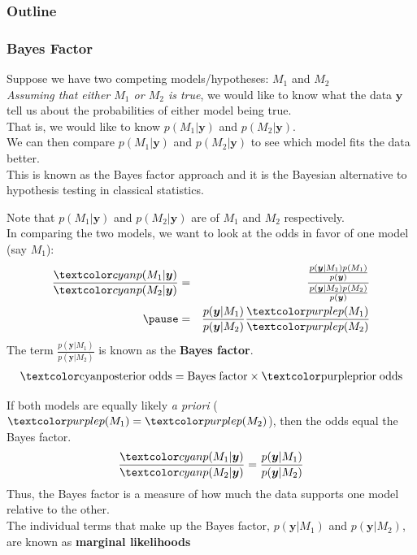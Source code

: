 \documentclass{beamer}
\begin{document}
\begin{frame}
\frametitle{Outline}
\tableofcontents[currentsection]
\end{frame}

\begin{frame}
\frametitle{Bayes Factor}
\pause
Suppose we have two competing models/hypotheses: \pause $M_1$ and $M_2$ \\
\pause
\bigskip
\textit{Assuming that either $M_1$ or $M_2$ is true}, we would like to know what the data $\bm{y}$ tell us about the probabilities of either model being true. \\
\pause
\bigskip
That is, we would like to know $p(M_1 | \bm{y})$ and $p(M_2 | \bm{y})$. \\
\bigskip
\pause 
We can then compare $p(M_1 | \bm{y})$ and $p(M_2 | \bm{y})$ to see which model fits the data better. \\
\pause
\bigskip
This is known as the Bayes factor approach and it is the Bayesian alternative to hypothesis testing in classical statistics.
\end{frame}

\begin{frame}
Note that $p(M_1 | \bm{y})$ and $p(M_2 | \bm{y})$ are  of $M_1$ and $M_2$ respectively.\\
\pause
\bigskip
In comparing the two models, we want to look at the  odds in favor of one model (say $M_1$):
\pause
\begin{eqnarray*}
\frac{\cyan{p(M_1 | \bm{y})}}{\cyan{p(M_2 | \bm{y})}} &=& \frac{\frac{p(\bm{y} | M_1) p(M_1)}{p(\bm{y})}}{\frac{p(\bm{y} | M_2) p(M_2)}{p(\bm{y})}} \\
\pause
&=& \frac{p(\bm{y} | M_1)}{p(\bm{y} | M_2)}  \frac{\purple{p(M_1)}}{\purple{p(M_2)}}
\end{eqnarray*}
\pause
The term $\frac{p(\bm{y} | M_1)}{p(\bm{y} | M_2)}$ is known as the \textbf{Bayes factor}.\\
\pause
\begin{eqnarray*}
\mathrm{\cyan{posterior \; odds} = Bayes \; factor \times \purple{prior \; odds}}
\end{eqnarray*} 
\end{frame}

\begin{frame}
If both models are equally likely \textit{a priori} ($\purple{p(M_1)} = \purple{p(M_2)}$), then the  odds equal the Bayes factor.  
\pause
\begin{eqnarray*}
\frac{\cyan{p(M_1 | \bm{y})}}{\cyan{p(M_2 | \bm{y})}} = \frac{p(\bm{y} | M_1)}{p(\bm{y} | M_2)} 
\end{eqnarray*}
\pause
Thus, the Bayes factor is a measure of how much the data supports one model relative to the other. \\
\pause
\bigskip
The individual terms that make up the Bayes factor, $p(\bm{y} | M_1)$ and $p(\bm{y} | M_2)$, are known as \textbf{marginal likelihoods}
\end{frame}
\end{document}

